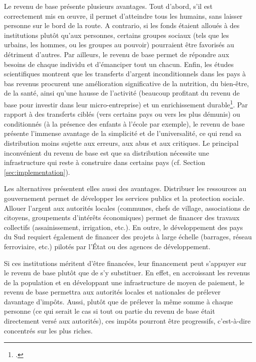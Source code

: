 \documentclass[a5paper,french,openany]{memoir}
\begin{document}
Le revenu de base présente plusieurs avantages. Tout d'abord, s'il est correctement mis en œuvre, il permet d'atteindre tous les humains, sans laisser personne sur le bord de la route. A contrario, si les fonds étaient alloués à des institutions plutôt qu'aux personnes, certains groupes sociaux (tels que les urbains, les hommes, ou les groupes au pouvoir) pourraient être favorisés au détriment d'autres. Par ailleurs, le revenu de base permet de répondre aux besoins de chaque individu et d'émanciper tout un chacun. Enfin, les études scientifiques montrent que les transferts d'argent inconditionnels dans les pays à bas revenus procurent une amélioration significative de la nutrition, du bien-être, de la santé, ainsi qu'une hausse de l'activité (beaucoup profitant du revenu de base pour investir dans leur micro-entreprise) et un enrichissement durable\footnote{\cite{haushofer_short-term_2016,egger_general_2022,standing_little_2014}.}. Par rapport à des transferts ciblés (vers certains pays ou vers les plus démunis) ou conditionnés (à la présence des enfants à l'école par exemple), le revenu de base présente l'immense avantage de la simplicité et de l'universalité, ce qui rend sa distribution moins sujette aux erreurs, aux abus et aux critiques. Le principal inconvénient du revenu de base est que sa distribution nécessite une infrastructure qui reste à construire dans certains pays (cf. Section \ref{sec:implementation}).  %

Les alternatives présentent elles aussi des avantages. Distribuer les ressources au gouvernement permet de développer les services publics et la protection sociale. Allouer l'argent aux autorités locales (communes, chefs de village, associations de citoyens, groupements d'intérêts économiques) permet de financer des travaux collectifs (assainissement, irrigation, etc.). En outre, le développement des pays du Sud requiert également de financer des projets à large échelle (barrages, réseau ferroviaire, etc.) pilotés par l'État ou des agences de développement. 

Si ces institutions méritent d'être financées, leur financement peut s'appuyer sur 
le revenu de base plutôt que de s'y substituer. En effet, en accroissant les revenus de la population et en développant une infrastructure de moyen de paiement, le revenu de base permettra aux autorités locales et nationales de prélever davantage d'impôts. Aussi, plutôt que de prélever la même somme à chaque personne (ce qui serait le cas si tout ou partie du revenu de base était directement versé aux autorités), ces impôts pourront être progressifs, c'est-à-dire concentrés sur les plus riches. 
\end{document}
